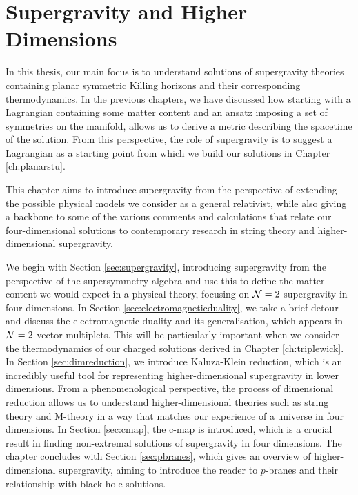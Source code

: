 \chapter{Supergravity and Higher Dimensions}
\label{ch:supergravity}

In this thesis, our main focus is to understand solutions of supergravity theories containing planar symmetric Killing horizons and their corresponding thermodynamics. In the previous chapters, we have discussed how starting with a Lagrangian containing some matter content and an ansatz imposing a set of symmetries on the manifold, allows us to derive a metric describing the spacetime of the solution. From this perspective, the role of supergravity is to suggest a Lagrangian as a starting point from which we build our solutions in Chapter \ref{ch:planarstu}.

This chapter aims to introduce supergravity from the perspective of extending the possible physical models we consider as a general relativist, while also giving a backbone to some of the various comments and calculations that relate our four-dimensional solutions to contemporary research in string theory and higher-dimensional supergravity. 

We begin with Section \ref{sec:supergravity}, introducing supergravity from the perspective of the supersymmetry algebra and use this to define the matter content we would expect in a physical theory, focusing on ${\cal N} = 2$ supergravity in four dimensions. In Section \ref{sec:electromagneticduality}, we take a brief detour and discuss the electromagnetic duality and its generalisation, which appears in ${\cal N} = 2$ vector multiplets. This will be particularly important when we consider the thermodynamics of our charged solutions derived in Chapter \ref{ch:triplewick}. In Section \ref{sec:dimreduction}, we introduce Kaluza-Klein reduction, which is an incredibly useful tool for representing higher-dimensional supergravity in lower dimensions. From a phenomenological perspective, the process of dimensional reduction allows us to understand higher-dimensional theories such as string theory and M-theory in a way that matches our experience of a universe in four dimensions. In Section \ref{sec:cmap}, the c-map is introduced, which is a crucial result in finding non-extremal solutions of supergravity in four dimensions. The chapter concludes with Section \ref{sec:pbranes}, which gives an overview of higher-dimensional supergravity, aiming to introduce the reader to $p$-branes and their relationship with black hole solutions.

